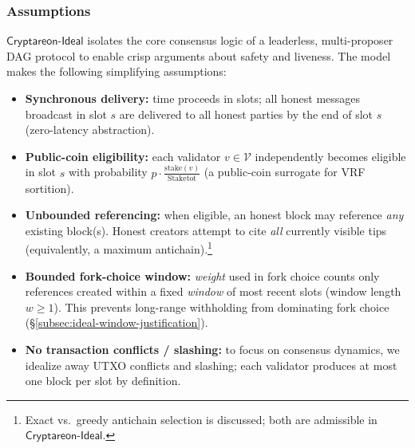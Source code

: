 \documentclass[11pt]{article}
\newcommand{\ProjIdeal}{\ensuremath{\mathsf{Cryptareon\text{-}Ideal}}\xspace}
\newcommand{\Val}{\ensuremath{\mathcal{V}}\xspace}
\newcommand{\stake}{\ensuremath{\mathrm{stake}}\xspace}
\newcommand{\StakeTot}{\ensuremath{\mathrm{Stake}{\mathrm{tot}}}\xspace}
\newcommand{\stakefrac}[1]{\ensuremath{\frac{\stake(#1)}{\StakeTot}}\xspace}
\newcommand{\Tips}{\ensuremath{\mathrm{Tips}}\xspace}
\begin{document}
\subsubsection{Assumptions}
\label{subsec:ideal-overview}
\ProjIdeal isolates the core consensus logic of a leaderless, multi-proposer DAG protocol to enable crisp arguments about safety and liveness. The model makes the following simplifying assumptions:
\begin{itemize}
  \item \textbf{Synchronous delivery:} time proceeds in slots; all honest messages broadcast in slot $s$ are delivered to all honest parties by the end of slot $s$ (zero-latency abstraction).
  \item \textbf{Public-coin eligibility:} each validator $v\in\Val$ independently becomes eligible in slot $s$ with probability $p\cdot\stakefrac{v}$ (a public-coin surrogate for VRF sortition).
  \item \textbf{Unbounded referencing:} when eligible, an honest block may reference \emph{any} existing block(s). Honest creators attempt to cite \emph{all} currently visible tips (equivalently, a maximum antichain).\footnote{Exact vs.\ greedy antichain selection is discussed; both are admissible in \ProjIdeal.}
  \item \textbf{Bounded fork-choice window:} \emph{weight} used in fork choice counts only references created within a fixed \emph{window} of most recent slots (window length $w\ge1$). This prevents long-range withholding from dominating fork choice (\S\ref{subsec:ideal-window-justification}).
  \item \textbf{No transaction conflicts / slashing:} to focus on consensus dynamics, we idealize away UTXO conflicts and slashing; each validator produces at most one block per slot by definition.
\end{itemize}

\end{document}
